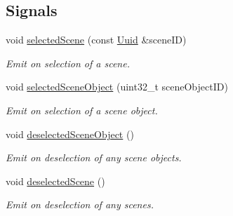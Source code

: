 \subsection*{Signals}
\begin{DoxyCompactItemize}
\item 
\mbox{\label{classrev_1_1_view_1_1_scene_tree_widget_ac697e6b36d82d0687d13692a71240950}} 
void \mbox{\hyperlink{classrev_1_1_view_1_1_scene_tree_widget_ac697e6b36d82d0687d13692a71240950}{selected\+Scene}} (const \mbox{\hyperlink{classrev_1_1_uuid}{Uuid}} \&scene\+ID)
\begin{DoxyCompactList}\small\item\em Emit on selection of a scene. \end{DoxyCompactList}\item 
\mbox{\label{classrev_1_1_view_1_1_scene_tree_widget_afd1a8d922eba4e88bf5455d3da843888}} 
void \mbox{\hyperlink{classrev_1_1_view_1_1_scene_tree_widget_afd1a8d922eba4e88bf5455d3da843888}{selected\+Scene\+Object}} (uint32\+\_\+t scene\+Object\+ID)
\begin{DoxyCompactList}\small\item\em Emit on selection of a scene object. \end{DoxyCompactList}\item 
\mbox{\label{classrev_1_1_view_1_1_scene_tree_widget_a7762f0622db396aa6197a364b5632939}} 
void \mbox{\hyperlink{classrev_1_1_view_1_1_scene_tree_widget_a7762f0622db396aa6197a364b5632939}{deselected\+Scene\+Object}} ()
\begin{DoxyCompactList}\small\item\em Emit on deselection of any scene objects. \end{DoxyCompactList}\item 
\mbox{\label{classrev_1_1_view_1_1_scene_tree_widget_a4bae70ed586546a7f7d616b91c784311}} 
void \mbox{\hyperlink{classrev_1_1_view_1_1_scene_tree_widget_a4bae70ed586546a7f7d616b91c784311}{deselected\+Scene}} ()
\begin{DoxyCompactList}\small\item\em Emit on deselection of any scenes. \end{DoxyCompactList}\end{DoxyCompactItemize}
